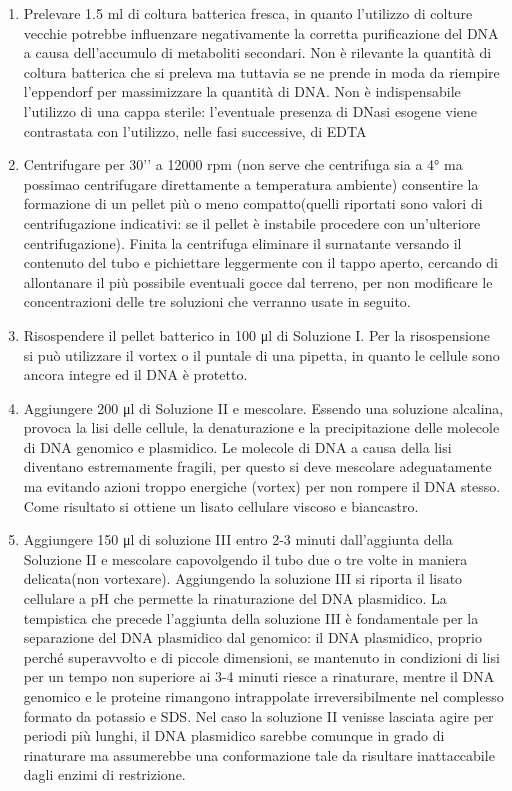 \begin{enumerate}
  \item Prelevare 1.5 ml di coltura batterica fresca, in quanto l’utilizzo di colture vecchie potrebbe influenzare negativamente la corretta purificazione del DNA a causa dell’accumulo di metaboliti secondari. Non è rilevante la quantità di coltura batterica che si preleva ma tuttavia se ne prende in moda da riempire l’eppendorf per massimizzare la quantità di DNA. Non è indispensabile l’utilizzo di una cappa sterile: l’eventuale presenza di DNasi esogene viene contrastata con l’utilizzo, nelle fasi successive, di EDTA
  \item Centrifugare per 30’’ a 12000 rpm (non serve che centrifuga sia a 4° ma possimao centrifugare direttamente a temperatura ambiente) consentire la formazione di un pellet più o meno compatto(quelli riportati sono valori di centrifugazione indicativi: se il pellet è instabile procedere con un’ulteriore centrifugazione). Finita la centrifuga eliminare il surnatante versando il contenuto del tubo e pichiettare leggermente con il tappo aperto, cercando di allontanare il più possibile eventuali gocce dal terreno, per non modificare le concentrazioni delle tre soluzioni che verranno usate in seguito.

  \item Risospendere il pellet batterico in 100 μl di Soluzione I. Per la risospensione si può utilizzare il vortex o il puntale di una pipetta, in quanto le cellule sono ancora integre ed il DNA è protetto.

  \item Aggiungere 200 μl di Soluzione II e mescolare. Essendo una soluzione alcalina, provoca la lisi delle cellule, la denaturazione e la  precipitazione delle molecole di DNA genomico e plasmidico.
Le molecole di DNA a causa della lisi diventano estremamente fragili, per questo si deve mescolare adeguatamente ma evitando azioni troppo energiche (vortex) per non rompere il DNA stesso.
Come risultato si ottiene un lisato cellulare viscoso e biancastro.

  \item Aggiungere 150 μl di soluzione III entro 2-3 minuti dall’aggiunta della Soluzione II e mescolare capovolgendo il tubo due o tre volte in maniera delicata(non vortexare). Aggiungendo la soluzione III si riporta il lisato cellulare a pH che permette la rinaturazione del DNA plasmidico.
La tempistica che precede l’aggiunta della soluzione III è fondamentale per la separazione del DNA plasmidico dal genomico: il DNA plasmidico, proprio perché superavvolto e di piccole dimensioni, se mantenuto in condizioni di lisi per un tempo non superiore ai 3-4 minuti riesce a rinaturare, mentre il DNA genomico e le proteine rimangono intrappolate irreversibilmente nel complesso formato da potassio e SDS. Nel caso la soluzione II venisse lasciata agire per periodi più lunghi, il DNA plasmidico sarebbe comunque in grado di rinaturare ma assumerebbe una conformazione tale da risultare inattaccabile dagli enzimi di restrizione.


\end{enumerate}
